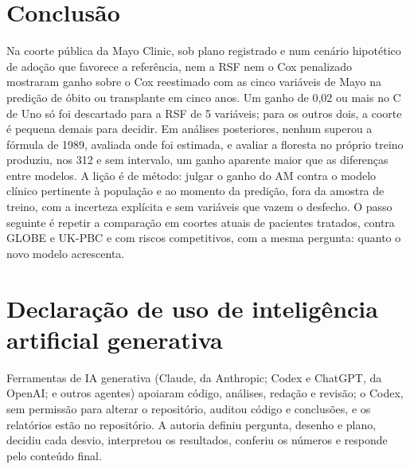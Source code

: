 \documentclass[12pt]{article}
\begin{document}
\section{Conclusão}\label{sec:conclusao}

Na coorte pública da Mayo Clinic, sob plano registrado e num cenário hipotético de adoção que favorece a referência, nem a RSF nem o Cox penalizado mostraram ganho sobre o Cox reestimado com as cinco variáveis de Mayo na predição de óbito ou transplante em cinco anos. Um ganho de 0,02 ou mais no C de Uno só foi descartado para a RSF de 5 variáveis; para os outros dois, a coorte é pequena demais para decidir. Em análises posteriores, nenhum superou a fórmula de 1989, avaliada onde foi estimada, e avaliar a floresta no próprio treino produziu, nos 312 e sem intervalo, um ganho aparente maior que as diferenças entre modelos. A lição é de método: julgar o ganho do AM contra o modelo clínico pertinente à população e ao momento da predição, fora da amostra de treino, com a incerteza explícita e sem variáveis que vazem o desfecho. O passo seguinte é repetir a comparação em coortes atuais de pacientes tratados, contra GLOBE e UK-PBC e com riscos competitivos, com a mesma pergunta: quanto o novo modelo acrescenta.

\section*{Declaração de uso de inteligência artificial generativa}

Ferramentas de IA generativa (Claude, da Anthropic; Codex e ChatGPT, da OpenAI; e outros agentes) apoiaram código, análises, redação e revisão; o Codex, sem permissão para alterar o repositório, auditou código e conclusões, e os relatórios estão no repositório. A autoria definiu pergunta, desenho e plano, decidiu cada desvio, interpretou os resultados, conferiu os números e responde pelo conteúdo final.



\end{document}
